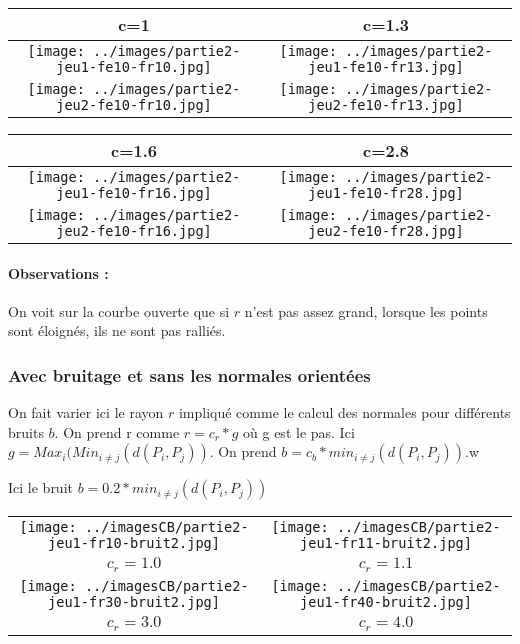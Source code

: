 \documentclass[11pt,a4paper]{article}
\begin{document}
\begin{center}
\begin{tabular}{|c|c|}
\hline
c=1         & c=1.3\\
\hline
\hline
\texttt{[image: ../images/partie2-jeu1-fe10-fr10.jpg]} & \texttt{[image: ../images/partie2-jeu1-fe10-fr13.jpg]}\\
\hline
\texttt{[image: ../images/partie2-jeu2-fe10-fr10.jpg]} & \texttt{[image: ../images/partie2-jeu2-fe10-fr13.jpg]}\\
\hline
\end{tabular}

\begin{tabular}{|c|c|}
\hline
c=1.6  & c=2.8\\
\hline
\hline
\texttt{[image: ../images/partie2-jeu1-fe10-fr16.jpg]} & \texttt{[image: ../images/partie2-jeu1-fe10-fr28.jpg]}\\
\hline
\texttt{[image: ../images/partie2-jeu2-fe10-fr16.jpg]} & \texttt{[image: ../images/partie2-jeu2-fe10-fr28.jpg]}\\
\hline
\end{tabular}
\end{center}

\paragraph{Observations :} On voit sur la courbe ouverte que si $r$ n'est pas assez grand, lorsque les points sont éloignés, ils ne sont
pas ralliés.

\subsubsection{Avec bruitage et sans les normales orientées}
On fait varier ici le rayon $r$ impliqué comme le calcul des normales pour différents bruits $b$. On prend r comme $r=c_r*g$ où g est le pas. Ici
$g=Max_i(Min_{i \neq j}(d(P_i,P_j))$. On prend $b=c_b*min_{i \neq j}(d(P_i,P_j))$.w

\pagebreak

Ici le bruit $b=0.2*min_{i \neq j}(d(P_i,P_j))$
\begin{center}
\begin{tabular}{|c|c|}
\hline
\texttt{[image: ../imagesCB/partie2-jeu1-fr10-bruit2.jpg]} & \texttt{[image: ../imagesCB/partie2-jeu1-fr11-bruit2.jpg]} \\
$c_r=1.0$                                                             & $c_r=1.1$ \\
\hline
\texttt{[image: ../imagesCB/partie2-jeu1-fr30-bruit2.jpg]} & \texttt{[image: ../imagesCB/partie2-jeu1-fr40-bruit2.jpg]} \\
$c_r=3.0$                                                             & $c_r=4.0$ \\
\hline
\end{tabular}
\end{center}
\end{document}
